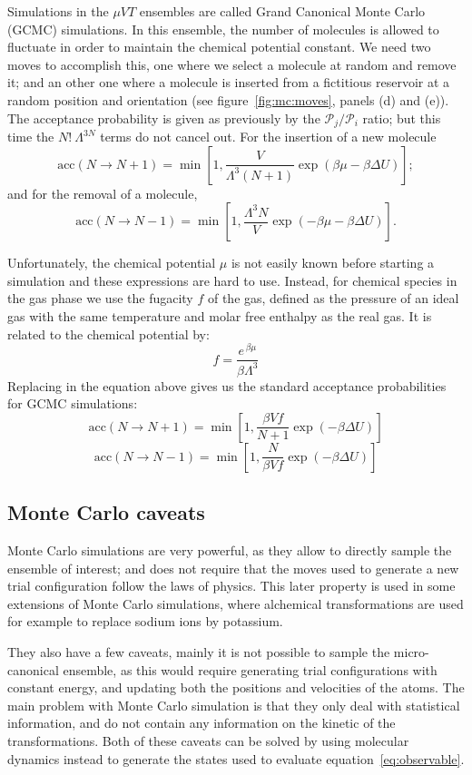 \documentclass[thesis]{subfiles}
\begin{document}
Simulations in the $\mu VT$ ensembles are called Grand Canonical Monte Carlo
(GCMC) simulations. In this ensemble, the number of molecules is allowed to
fluctuate in order to maintain the chemical potential constant. We need two
moves to accomplish this, one where we select a molecule at random and remove
it; and an other one where a molecule is inserted from a fictitious reservoir at
a random position and orientation (see figure~\ref{fig:mc:moves}, panels (d) and
(e)). The acceptance probability is given as previously by the $\mathcal{P}_j /
\mathcal{P}_i$ ratio; but this time the $N!\ \Lambda^{3N}$ terms do not cancel
out. For the insertion of a new molecule
\[ \text{acc}(N \to N + 1) = \min\left[1, \frac{V}{\Lambda^3 (N + 1)} \exp\left(\beta \mu - \beta \Delta U \right)\right]; \]
and for the removal of a molecule,
\[ \text{acc}(N \to N - 1) = \min\left[1, \frac{\Lambda^3 N}{V} \exp\left(-\beta \mu - \beta \Delta U \right)\right]. \]

Unfortunately, the chemical potential $\mu$ is not easily known before starting
a simulation and these expressions are hard to use. Instead, for chemical
species in the gas phase we use the fugacity $f$ of the gas, defined as the
pressure of an ideal gas with the same temperature and molar free enthalpy as
the real gas. It is related to the chemical potential by:
\[ f = \frac{e^{\,\beta \mu}}{\beta \Lambda^3}\]
Replacing in the equation above gives us the standard acceptance probabilities
for GCMC simulations:
\[ \text{acc}(N \to N + 1) = \min\left[1, \frac{\beta V f}{N + 1} \exp\left(- \beta \Delta U \right)\right] \]
\[ \text{acc}(N \to N - 1) = \min\left[1, \frac{N}{\beta V f} \exp\left(- \beta \Delta U \right)\right] \]

\subsection{Monte Carlo caveats}

Monte Carlo simulations are very powerful, as they allow to directly sample the
ensemble of interest; and does not require that the moves used to generate a new
trial configuration follow the laws of physics. This later property is used in
some extensions of Monte Carlo simulations, where alchemical transformations are
used for example to replace sodium ions by potassium.

They also have a few caveats, mainly it is not possible to sample the
micro-canonical ensemble, as this would require generating trial configurations
with constant energy, and updating both the positions and velocities of the
atoms. The main problem with Monte Carlo simulation is that they only deal with
statistical information, and do not contain any information on the kinetic of
the transformations. Both of these caveats can be solved by using molecular
dynamics instead to generate the states used to evaluate
equation~\eqref{eq:observable}.
\end{document}
